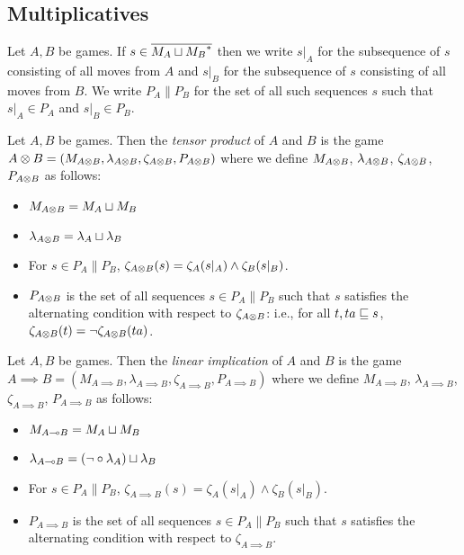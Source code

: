 \documentclass{article}
\begin{document}
\subsection{Multiplicatives}

Let $A,B$ be games.  If $s\in {\overline{{M_A\sqcup M_B}^{*}}}$ then we write $s\vert_A$ for the subsequence of $s$ consisting of all moves from $A$ and $s\vert_B$ for the subsequence of $s$ consisting of all moves from $B$.  We write $P_A\|P_B$ for the set of all such sequences $s$ such that $s\vert_A\in P_A$ and $s\vert_B\in P_B$.  

\begin{definition}
  Let $A,B$ be games.  Then the \emph{tensor product} of $A$ and $B$ is the game $A\otimes B=(M_{A\otimes B}, \lambda_{A\otimes B}, \zeta_{A\otimes B}, P_{A\otimes B})$ where we define $M_{A\otimes B}$, $\lambda_{A\otimes B}$, $\zeta_{A\otimes B}$, $P_{A\otimes B}$ as follows:
  \begin{itemize}
    \item $M_{A\otimes B} = M_A \sqcup M_B$
    \item $\lambda_{A\otimes B} = \lambda_A \sqcup \lambda_B$
    \item For $s\in P_A\|P_B$, $\zeta_{A\otimes B}(s) = \zeta_A(s\vert_A) \wedge \zeta_B(s\vert_B)$.
    \item $P_{A\otimes B}$ is the set of all sequences $s\in P_A\|P_B$ such that $s$ satisfies the alternating condition with respect to $\zeta_{A\otimes B}$: i.e., for all $t,ta\sqsubseteq s$, $\zeta_{A\otimes B}(t) = \neg\zeta_{A\otimes B}(ta)$.  
  \end{itemize}
\end{definition}

\begin{definition}
  Let $A,B$ be games.  Then the \emph{linear implication} of $A$ and $B$ is the game $A\implies B=(M_{A\implies B}, \lambda_{A\implies B}, \zeta_{A\implies B}, P_{A\implies B})$ where we define $M_{A\implies B}$, $\lambda_{A\implies B}$, $\zeta_{A\implies B}$, $P_{A\implies B}$ as follows:
  \begin{itemize}
    \item $M_{A\multimap B} = M_A \sqcup M_B$
    \item $\lambda_{A\multimap B} = (\neg\circ\lambda_A) \sqcup \lambda_B$
    \item For $s\in P_A\|P_B$, $\zeta_{A\implies B}(s) = \zeta_A(s\vert_A) \wedge \zeta_B(s\vert_B)$.
    \item $P_{A\implies B}$ is the set of all sequences $s\in P_A\|P_B$ such that $s$ satisfies the alternating condition with respect to $\zeta_{A\implies B}$.  
  \end{itemize}
\end{definition}
\end{document}

